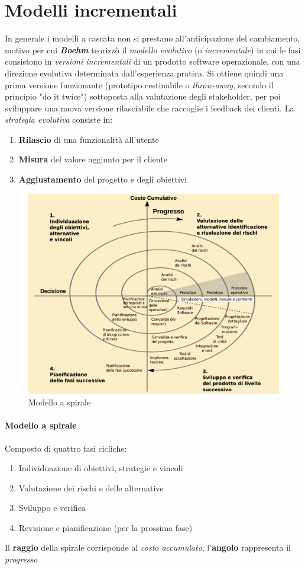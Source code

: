 \newpage

\section{Modelli incrementali}

In generale i modelli a cascata non si prestano all'anticipazione del cambiamento, motivo per cui \textbf{\textit{Boehm}} teorizzò il \textit{modello evolutivo} (o \textit{incrementale}) in cui le fasi consistono in \textit{versioni incrementali} di un prodotto software operazionale, con una direzione evolutiva determinata dall'esperienza pratica. Si ottiene quindi una prima versione funzionante (prototipo cestinabile o \textit{throw-away}, secondo il principio "do it twice") sottoposta alla valutazione degli stakeholder, per poi sviluppare una nuova versione rilasciabile che raccoglie i feedback dei clienti. La \textit{strategia evolutiva} consiste in:
\begin{enumerate}
    \item \textbf{Rilascio} di una funzionalità all'utente
    \item \textbf{Misura} del valore aggiunto per il cliente
    \item \textbf{Aggiustamento} del progetto e degli obiettivi
\end{enumerate}

\begin{figure}[h!]
    \centering
    \includegraphics[width=0.75\linewidth]{assets/spirale.png}
    \caption{Modello a spirale}
    \label{fig:modello-spirale}
\end{figure}

\paragraph{Modello a spirale} Composto di quattro fasi cicliche:
\begin{enumerate}
    \item Individuazione di obiettivi, strategie e vincoli
    \item Valutazione dei rischi e delle alternative
    \item Sviluppo e verifica
    \item Revisione e pianificazione (per la prossima fase)
\end{enumerate}
Il \textbf{raggio} della spirale corrisponde al \textit{costo accumulato}, l'\textbf{angolo} rappresenta il \textit{progresso}

